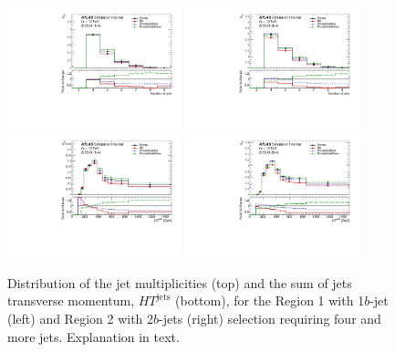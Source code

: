 \begin{figure}[!htb]
\centering
\includegraphics[width=0.45\textwidth]{Plots/ttV/generator/c_Region_0_nJets}
\includegraphics[width=0.45\textwidth]{Plots/ttV/generator/c_Region_1_nJets}\\
\includegraphics[width=0.45\textwidth]{Plots/ttV/generator/c_Region_0_HT_jets}
\includegraphics[width=0.45\textwidth]{Plots/ttV/generator/c_Region_1_HT_jets}\\
  \caption{Distribution of the jet multiplicities (top) and the sum of jets transverse momentum, $HT^{\text{jets}}$ (bottom), for the Region 1 with 1$b$-jet (left) and Region 2 with 2$b$-jets (right) selection requiring four and more jets. Explanation in text. \label{ttV:den_4j12b}}
\end{figure}


